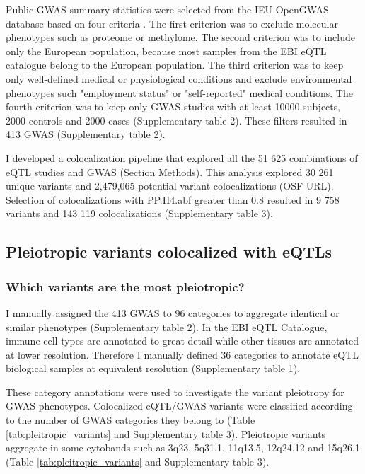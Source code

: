 Public GWAS summary statistics were selected from the IEU OpenGWAS database based on four criteria \citep{2018.Parkinson.Buniello}.
%
The first criterion was to exclude molecular phenotypes such as proteome or methylome.
%	
The second criterion was to include only the European population, because most samples from the EBI eQTL catalogue belong to the European population.
%
The third criterion was to keep only well-defined medical or physiological conditions and exclude environmental phenotypes such "employment status" or "self-reported" medical conditions.
%
The fourth criterion was to keep only GWAS studies with at least 10000 subjects, 2000 controls and 2000 cases (Supplementary table 2).
%
These filters resulted in 413 GWAS (Supplementary table 2).

I developed a colocalization pipeline that explored all the 51 625 combinations of eQTL studies and GWAS (Section Methods).
%
This analysis explored 30 261 unique variants and 2,479,065 potential variant colocalizations (OSF URL).
%
Selection of colocalizations with PP.H4.abf greater than 0.8 resulted in 9 758 variants and 143 119 colocalizations (Supplementary table 3).

\subsection*{Pleiotropic variants colocalized with eQTLs}

\subsubsection*{Which variants are the most pleiotropic?}

I manually assigned the 413 GWAS to 96 categories to aggregate identical or similar phenotypes (Supplementary table 2).
%
In the EBI eQTL Catalogue, immune cell types are annotated to great detail while other tissues are annotated at lower resolution.
%
Therefore I manually defined 36 categories to annotate eQTL biological samples at equivalent resolution (Supplementary table 1).

These category annotations were used to investigate the variant pleiotropy for GWAS phenotypes.
%
Colocalized eQTL/GWAS variants were classified according to the number of GWAS categories they belong to (Table \ref{tab:pleitropic_variants} and Supplementary table 3).
%
Pleiotropic variants aggregate in some cytobands such as 3q23, 5q31.1, 11q13.5, 12q24.12 and 15q26.1 (Table \ref{tab:pleitropic_variants} and Supplementary table 3).

